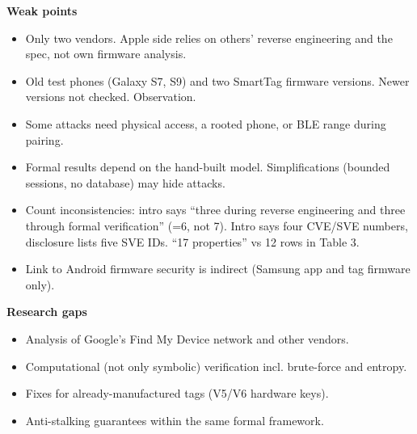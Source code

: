 \documentclass[11pt,a4paper]{article}
\begin{document}
\begin{enumerate}
    \vspace{4pt}
    \textbf{Weak points}
    \begin{itemize}
        \item Only two vendors. Apple side relies on others' reverse engineering and the spec, not own firmware analysis.
        \item Old test phones (Galaxy S7, S9) and two SmartTag firmware versions. Newer versions not checked. Observation.
        \item Some attacks need physical access, a rooted phone, or BLE range during pairing.
        \item Formal results depend on the hand-built model. Simplifications (bounded sessions, no database) may hide attacks.
        \item Count inconsistencies: intro says ``three during reverse engineering and three through formal verification'' (=6, not 7). Intro says four CVE/SVE numbers, disclosure lists five SVE IDs. ``17 properties'' vs 12 rows in Table 3.
        \item Link to Android firmware security is indirect (Samsung app and tag firmware only).
    \end{itemize}

    \vspace{4pt}
    \textbf{Research gaps}
    \begin{itemize}
        \item Analysis of Google's Find My Device network and other vendors.
        \item Computational (not only symbolic) verification incl. brute-force and entropy.
        \item Fixes for already-manufactured tags (V5/V6 hardware keys).
        \item Anti-stalking guarantees within the same formal framework.
    \end{itemize}

\end{enumerate}
\end{document}
